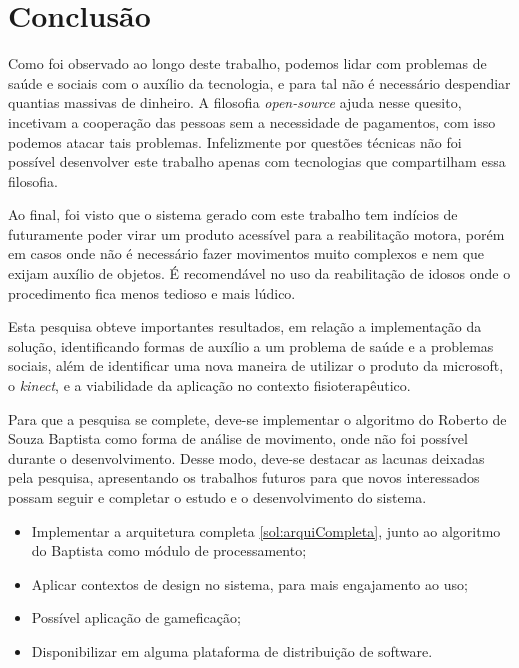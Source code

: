 \chapter[Conclusão]{Conclusão}\label{ch:conclusao}
  Como foi observado ao longo deste trabalho, podemos lidar com problemas de saúde e sociais com o auxílio da tecnologia,
e para tal não é necessário despendiar quantias massivas de dinheiro. A filosofia \textit{open-source} ajuda nesse quesito, incetivam a cooperação das pessoas
sem a necessidade de pagamentos, com isso podemos atacar tais problemas. Infelizmente por questões  técnicas não foi possível desenvolver este trabalho apenas com
tecnologias que compartilham essa filosofia.

  Ao final, foi visto que o sistema gerado com este trabalho tem indícios de futuramente poder virar um produto acessível para a reabilitação motora, porém em casos onde não é necessário
fazer movimentos muito complexos e nem que exijam auxílio de objetos. É recomendável no uso da reabilitação de idosos onde o procedimento
fica menos tedioso e mais lúdico.

Esta pesquisa obteve importantes resultados, em relação a implementação da solução, identificando
formas de auxílio a um problema de saúde e a problemas sociais, além de identificar uma nova maneira de utilizar o produto da microsoft, o
\textit{kinect}, e a viabilidade da aplicação no
contexto fisioterapêutico.

Para que a pesquisa se complete, deve-se implementar o algoritmo do Roberto de Souza Baptista \cite{roberto} como forma
de análise de movimento, onde não foi possível durante o desenvolvimento. Desse modo, deve-se destacar as lacunas
deixadas pela pesquisa, apresentando os trabalhos futuros para que novos interessados
possam seguir e completar o estudo e o desenvolvimento do sistema.
\begin{itemize}
  \item Implementar a arquitetura completa \ref{sol:arquiCompleta}, junto ao algoritmo do Baptista \cite{roberto} como módulo de processamento;
  \item Aplicar contextos de design no sistema, para mais engajamento ao uso;
  \item Possível aplicação de gameficação;
  \item Disponibilizar em alguma plataforma de distribuição de software.
\end{itemize}
